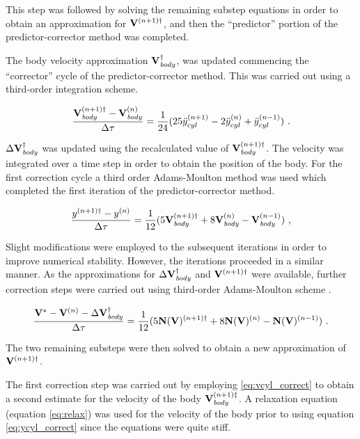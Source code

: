 This step was followed by solving the remaining substep equations in order to obtain an approximation for  $\mathbf{V}^{(n+1)\dag}$, and then the ``predictor'' portion of the predictor-corrector method was completed.

The body velocity approximation $\mathbf{V}_{\mathit{body}}^{\dag}$, was updated commencing the ``corrector'' cycle of the predictor-corrector method. This was carried out using a third-order integration scheme. 

 \begin{equation} \centering
 \label{eq:vcyl_correct}
 \frac{\Vcyl^{(n+1)\dag} - \Vcyl^{(n)}}{\Delta\tau} = \frac{1}{24}(25\ddot{y}_{cyl}^{(n+1)} - 2\ddot{y}_{cyl}^{(n)} + \ddot{y}_{cyl}^{(n-1)}) ~.
 \end{equation}
 
 $\Delta\mathbf{V}_{\mathit{body}}^{\dag}$ was updated using the recalculated value of $\mathbf{V}_{\mathit{body}}^{(n+1)\dag}$. The velocity was integrated over a time step in order to obtain the position of the body. For the first correction cycle a third order Adams-Moulton method was used which completed the first iteration of the predictor-corrector method. 
 
 \begin{equation} \centering
 \label{eq:ycyl_correct}
 \frac{y^{(n+1)\dag} - y^{(n)}}{\Delta\tau} = \frac{1}{12}(5\Vcyl^{(n+1)\dag} + 8\Vcyl^{(n)} - \Vcyl^{(n-1)}) ~,
 \end{equation}
 
 Slight modifications were employed to the subsequent iterations in order to improve numerical stability. However, the iterations proceeded in a similar manner. As the approximations for  $\Delta\mathbf{V}_{\mathit{body}}^{\dag}$ and $\mathbf{V}^{(n+1)\dag}$  were available, further correction steps were carried out using third-order Adams-Moulton scheme . 
 
 \begin{equation} \centering
 \label{eq:predict_general}
 \frac{\Vint - \Vn - \Delta\Vcyl^{\dag}}{\Delta\tau} = \frac{1}{12}(5\mathbf{N}(\vecV)^{(n+1)\dag} + 8\mathbf{N}(\vecV)^{(n)} - \mathbf{N}(\vecV)^{(n-1)}) ~.
 \end{equation}
 
 The two remaining substeps were then solved to obtain a new approximation of $\mathbf{V}^{(n+1)\dag}$. 
 
 The first correction step was carried out by employing \ref{eq:vcyl_correct} to obtain a second estimate for the velocity of the body $\mathbf{V}_{\mathit{body}}^{(n+1)\ddag}$. A relaxation equation (equation \ref{eq:relax}) was used for the velocity of the body prior to using equation \ref{eq:ycyl_correct} since the equations were quite stiff.
 

